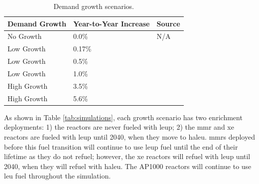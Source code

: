 \begin{table}[H]
    \centering
    \caption{Demand growth scenarios.}
    \label{tab:demand_scenarios}
    \begin{tabular}{l l l}
        \hline
        \textbf{Demand Growth} & \textbf{Year-to-Year Increase} & \textbf{Source}\\
        \hline
        No Growth & 0.0\% & N/A\\
        Low Growth & 0.17\% & \cite{eia_aeo_2023}\\
        Low Growth & 0.5\% & \cite{eia_aeo_2023}\\
        Low Growth & 1.0\% & \cite{eia_aeo_2023}\\
        High Growth & 3.5\% & \cite{julie_liftoff_pathways_2024} \\
        High Growth & 5.6\% & \cite{julie_liftoff_pathways_2024}\\
        \hline
    \end{tabular}
  \end{table}

As shown in Table \ref{tab:simulations}, each growth scenario has two enrichment deployments: 1) the reactors are never fueled with \gls{leup}; 2) the \gls{mmr} and \gls{xe} reactors are fueled with \gls{leup} until 2040, when they move to \gls{haleu}. \glspl{mmr} deployed before this fuel transition will continue to use \gls{leup} fuel until the end of their lifetime as they do not refuel; however, the \gls{xe} reactors will refuel with \gls{leup} until 2040, when they will refuel with \gls{haleu}. The AP1000 reactors will continue to use \gls{leu} fuel throughout the simulation.




